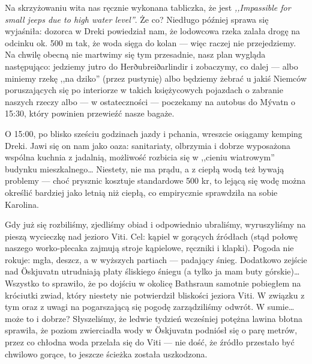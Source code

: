 
Na skrzyżowaniu wita nas ręcznie wykonana tabliczka, że  jest \emph{,,Impassible for small jeeps due to high water level''}. Że co? Niedługo później sprawa się wyjaśniła: dozorca w Dreki powiedział nam, że lodowcowa rzeka zalała drogę na odcinku ok. 500 m tak, że woda sięga do kolan --- więc raczej nie przejedziemy. Na chwilę obecną nie martwimy się tym przesadnie, nasz plan wygląda następująco: jedziemy jutro do Herðubreiðarlindir i zobaczymy, co dalej --- albo miniemy rzekę ,,na dziko'' (przez pustynię) albo będziemy żebrać u jakiś Niemców poruszających się po interiorze w takich księżycowych pojazdach o zabranie naszych rzeczy albo --- w ostateczności --- poczekamy na autobus do Mývatn o 15:30, który powinien przewieźć nasze bagaże.

O 15:00, po blisko sześciu godzinach jazdy i pchania, wreszcie osiągamy kemping Dreki. Jawi się on nam jako oaza: sanitariaty, olbrzymia i dobrze wyposażona wspólna kuchnia z jadalnią, możliwość rozbicia się w ,,cieniu wiatrowym'' budynku mieszkalnego… Niestety, nie ma prądu, a z ciepłą wodą też bywają problemy --- choć prysznic kosztuje standardowe 500 kr, to lejącą się wodę można określić bardziej jako letnią niż ciepłą, co empirycznie sprawdziła na sobie Karolina.

Gdy już się rozbiliśmy, zjedliśmy obiad i odpowiednio ubraliśmy, wyruszyliśmy na pieszą wycieczkę nad jezioro Viti. Cel: kąpiel w gorących źródłach (stąd połowę naszego worko-plecaka zajmują stroje kąpielowe, ręczniki i klapki). Pogoda nie rokuje: mgła, deszcz, a w wyższych partiach --- padający śnieg. Dodatkowo zejście nad Öskjuvatn utrudniają płaty śliskiego śniegu (a tylko ja mam buty górskie)… Wszystko to sprawiło, że po dojściu w okolicę Bathsraun samotnie pobiegłem na króciutki zwiad, który niestety nie potwierdził bliskości jeziora Viti. W związku z tym oraz z uwagi na pogarszającą się pogodę zarządziliśmy odwrót. W sumie… może to i dobrze? Słyszeliśmy, że ledwie tydzień wcześniej potężna lawina błotna sprawiła, że poziom zwierciadła wody w Öskjuvatn podniósł się o parę metrów, przez co chłodna woda przelała się do Viti --- nie dość, że źródło przestało być chwilowo gorące, to jeszcze ścieżka została uszkodzona.


